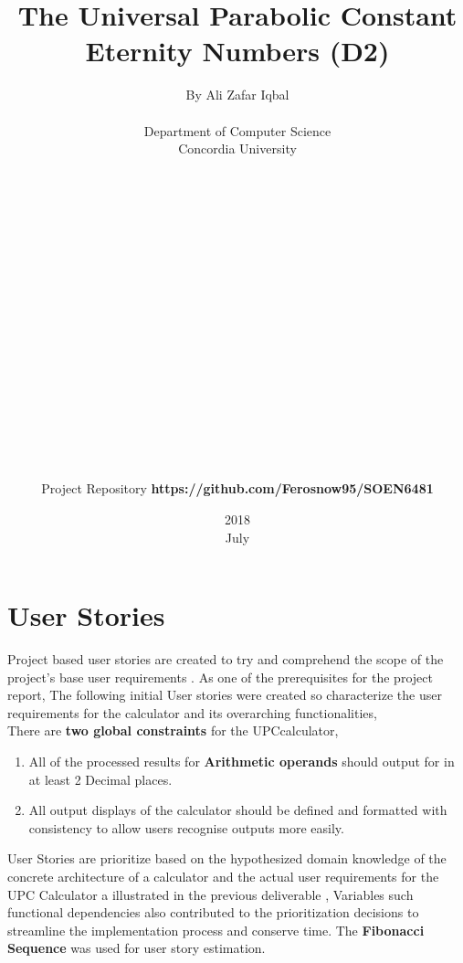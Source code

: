 \documentclass[12pt]{report}
\title{The Universal Parabolic Constant\\ \textbf{Eternity Numbers (D2)}}
\date{2018\\ July}
\author{By Ali Zafar Iqbal\\\\ Department of Computer Science \\Concordia University\\\\\\\\\\\\\\\\\\\\\\\\\\\\\\\\\\\\\\Project Repository \textbf{https://github.com/Ferosnow95/SOEN6481} }
\date{}
\begin{document}
 
\maketitle 


\baselineskip20pt


\tableofcontents




\newpage




 


\chapter{User Stories}
    
   Project based user stories are created to try and comprehend the scope of the project's  base user requirements .  As one of the prerequisites for the project report,  The following initial User stories were created so characterize the user requirements for the calculator and its overarching functionalities, \\
   There are \textbf{two global constraints} for the UPCcalculator, \begin{enumerate}
   
       \item All of the processed results for \textbf{Arithmetic operands} should output for in at least 2 Decimal places.
       \item All output displays of the calculator should be defined and formatted with consistency to allow users recognise outputs more easily.
   \end{enumerate}
   
   
   \noindent User Stories are prioritize based on the hypothesized domain knowledge of the concrete architecture of a calculator and the actual user requirements for the UPC Calculator a illustrated in the previous deliverable  , Variables such functional dependencies also contributed to the prioritization decisions to streamline the implementation process and conserve time. The \textbf{Fibonacci Sequence} was used for user story estimation.
\end{document}
